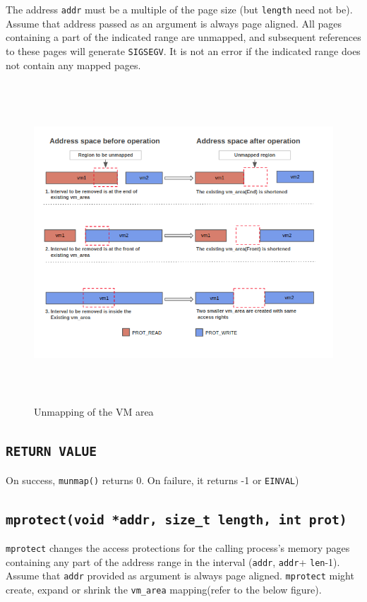 \documentclass[12pt]{article}
\begin{document}
 The address {\tt addr} must be a multiple of the page size (but {\tt length} need not be). Assume that address passed as an argument is always page aligned.  All pages containing a part of the indicated range are unmapped, and subsequent references to these pages will 		generate {\tt SIGSEGV}.  It is not an error if the indicated range does not contain any mapped pages.

\begin{figure}[H]
    \centering
    \includegraphics[width=14cm,height=12cm]{mm5.png}
    \caption{Unmapping of the VM area}
    \label{fig:my_label}
\end{figure}

\subsection*{\tt RETURN VALUE}
\noindent On success, {\tt munmap()} returns 0.  On failure, it returns -1 or {\tt EINVAL})

\newpage

\subsection *{\tt mprotect(void *addr, size\_t length, int prot)}
{\tt mprotect} changes the access protections for the calling process's memory pages containing any part of the address range in the interval  ({\tt addr}, {\tt addr}+ {\tt len}-1).  Assume that {\tt addr} provided as argument is always page aligned. {\tt mprotect} might create, expand or shrink the {\tt vm\_area} mapping(refer to the below figure).
\end{document}
